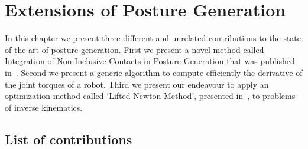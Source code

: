

\chapter{Extensions of Posture Generation}
\label{cha:extensions_of_posture_generation}

\graphicspath{{Chapter2-Extensions/Figs/IROS14/}}

In this chapter we present three different and unrelated contributions to the state of the art of posture generation.
First we present a novel method called Integration of Non-Inclusive Contacts in Posture Generation that was published in~\cite{brossette:iros:2014}.
Second we present a generic algorithm to compute efficiently the derivative of the joint torques of a robot.
Third we present our endeavour to apply an optimization method called `Lifted Newton Method', presented in~\cite{Albersmeyer:2010:LNM:1958447.1958472}, to problems of inverse kinematics.


\section{List of contributions}


